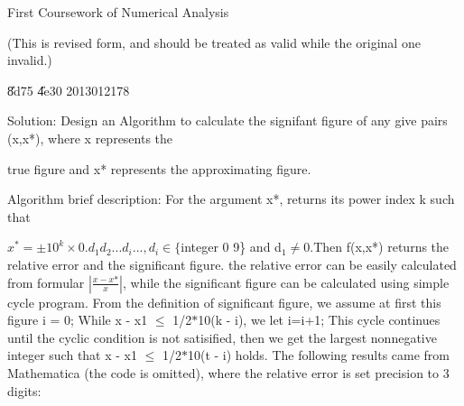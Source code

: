 \documentclass{article}
\begin{document}
\bigskip First Coursework of Numerical Analysis

(This is revised form, and should be treated as valid while the original one
invalid.)

\qquad \qquad \qquad \qquad \qquad \qquad \qquad \qquad \qquad \qquad \qquad
\qquad \qquad \qquad \qquad \qquad \qquad \qquad \qquad \qquad \qquad \qquad
\qquad \qquad \qquad \qquad \qquad \qquad \qquad \qquad \qquad \qquad \qquad
\qquad \qquad \qquad \qquad \qquad \qquad \qquad \qquad \qquad \U{8d75}%
\U{4e30} 2013012178


Solution: Design an Algorithm to calculate the signifant figure of any give
pairs (x,x*), where x represents the 

true figure and x* represents the approximating figure.

Algorithm brief description: For the argument x*, returns its power index k
such that 

$x^{\ast }=\pm 10^{k}\times 0.d_{1}d_{2}...d_{i}...,d_{i}\in \{$integer 0%
9\} and d$_{1}\neq 0.$Then f(x,x*) returns the relative error
and the significant figure.  the relative error can be easily calculated
from formular $|\frac{x-x\text{*}}{x}|$, while the significant figure can be
calculated using simple cycle program. From the definition of significant
figure, we assume at first this figure i = 0; While \TEXTsymbol{\vert}x - x1%
\TEXTsymbol{\vert} $\leq $ 1/2$\ast $10(k - i), we let i=i+1;
This cycle continues until the cyclic condition is not satisified, then we
get the largest nonnegative integer such that \TEXTsymbol{\vert}x - x1%
\TEXTsymbol{\vert} $\leq $ 1/2$\ast $10(t - i) holds. The
following results came from Mathematica (the code is omitted), where the
relative error is set precision to 3 digits:

\end{document}
